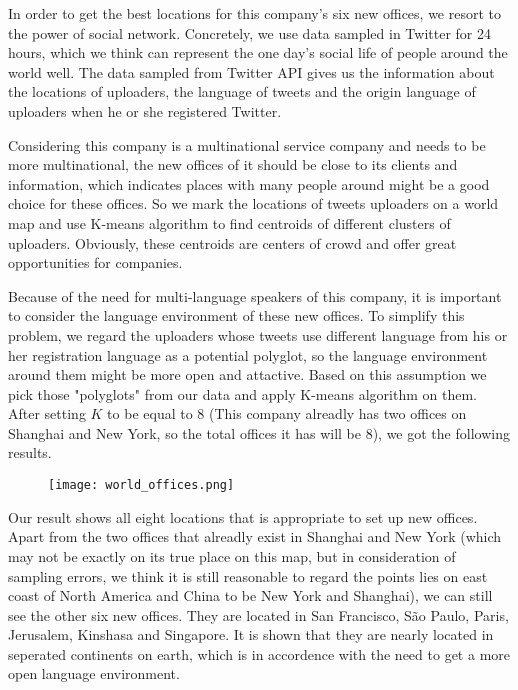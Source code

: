 \documentclass{mcmthesis}
\begin{document}
  \indent \indent In order to get the best locations for this company's six new offices, we resort to the power of social network. Concretely, we use data sampled in Twitter for 24 hours, which we think can represent the one day's social life of people around the world well. The data sampled from Twitter API gives us the information about the locations of uploaders, the language of tweets and the origin language of uploaders when he or she registered Twitter. 

  \indent Considering this company is a multinational service company and needs to be more multinational, the new offices of it should be close to its clients and information, which indicates places with many people around might be a good choice for these offices. So we mark the locations of tweets uploaders on a world map and use K-means algorithm to find centroids of different clusters of uploaders. Obviously, these centroids are centers of crowd and offer great opportunities for companies.
  
  \indent Because of the need for multi-language speakers of this company, it is important to consider the language environment of these new offices. To simplify this problem, we regard the uploaders whose tweets use different language from his or her registration language as a potential polyglot, so the language environment around them might be more open and attactive. Based on this assumption we pick those "polyglots" from our data and apply K-means algorithm on them. After setting $K$ to be equal to 8 (This company alreadly has two offices on Shanghai and New York, so the total offices it has will be 8), we got the following results.

  \begin{figure}[h]
    \small
    \centering
    \texttt{[image: world\_offices.png]}
  \end{figure}

  \indent Our result shows all eight locations that is appropriate to set up new offices. Apart from the two offices that alreadly exist in Shanghai and New York (which may not be exactly on its true place on this map, but in consideration of sampling errors, we think it is still reasonable to regard the points lies on east coast of North America and China to be New York and Shanghai), we can still see the other six new offices. They are located in San Francisco, São Paulo, Paris, Jerusalem, Kinshasa and Singapore. It is shown that they are nearly located in seperated continents on earth, which is in accordence with the need to get a more open language environment.
\end{document}
